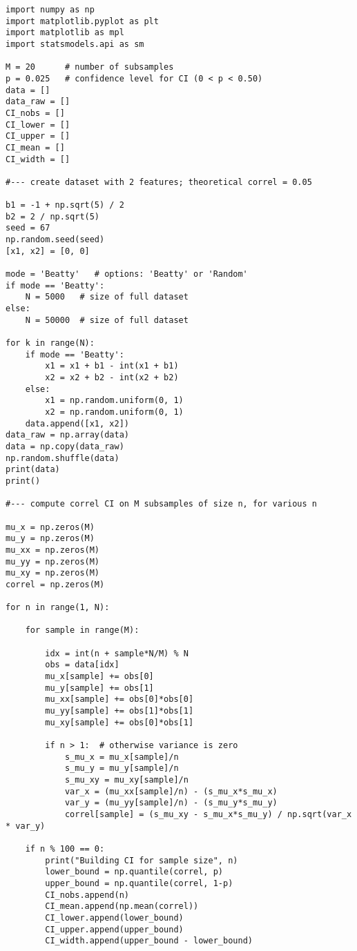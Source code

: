 \documentclass[oneside,10pt]{book}
\begin{document}
\begin{lstlisting}
import numpy as np
import matplotlib.pyplot as plt
import matplotlib as mpl
import statsmodels.api as sm

M = 20      # number of subsamples
p = 0.025   # confidence level for CI (0 < p < 0.50)
data = []
data_raw = []
CI_nobs = []
CI_lower = []
CI_upper = []
CI_mean = [] 
CI_width = []

#--- create dataset with 2 features; theoretical correl = 0.05 

b1 = -1 + np.sqrt(5) / 2
b2 = 2 / np.sqrt(5)
seed = 67
np.random.seed(seed)
[x1, x2] = [0, 0]

mode = 'Beatty'   # options: 'Beatty' or 'Random'
if mode == 'Beatty':
    N = 5000   # size of full dataset
else:
    N = 50000  # size of full dataset

for k in range(N): 
    if mode == 'Beatty':
        x1 = x1 + b1 - int(x1 + b1)
        x2 = x2 + b2 - int(x2 + b2)
    else:
        x1 = np.random.uniform(0, 1) 
        x2 = np.random.uniform(0, 1) 
    data.append([x1, x2])
data_raw = np.array(data)
data = np.copy(data_raw)
np.random.shuffle(data)
print(data)
print()

#--- compute correl CI on M subsamples of size n, for various n

mu_x = np.zeros(M)
mu_y = np.zeros(M)
mu_xx = np.zeros(M)
mu_yy = np.zeros(M)
mu_xy = np.zeros(M)
correl = np.zeros(M)

for n in range(1, N): 

    for sample in range(M):

        idx = int(n + sample*N/M) % N
        obs = data[idx]
        mu_x[sample] += obs[0]
        mu_y[sample] += obs[1]
        mu_xx[sample] += obs[0]*obs[0]  
        mu_yy[sample] += obs[1]*obs[1]  
        mu_xy[sample] += obs[0]*obs[1]  

        if n > 1:  # otherwise variance is zero
            s_mu_x = mu_x[sample]/n  
            s_mu_y = mu_y[sample]/n  
            s_mu_xy = mu_xy[sample]/n 
            var_x = (mu_xx[sample]/n) - (s_mu_x*s_mu_x)
            var_y = (mu_yy[sample]/n) - (s_mu_y*s_mu_y)
            correl[sample] = (s_mu_xy - s_mu_x*s_mu_y) / np.sqrt(var_x * var_y)
  
    if n % 100 == 0:  
        print("Building CI for sample size", n)
        lower_bound = np.quantile(correl, p)
        upper_bound = np.quantile(correl, 1-p)
        CI_nobs.append(n)
        CI_mean.append(np.mean(correl)) 
        CI_lower.append(lower_bound)
        CI_upper.append(upper_bound)
        CI_width.append(upper_bound - lower_bound)


\end{lstlisting}
\end{document}
